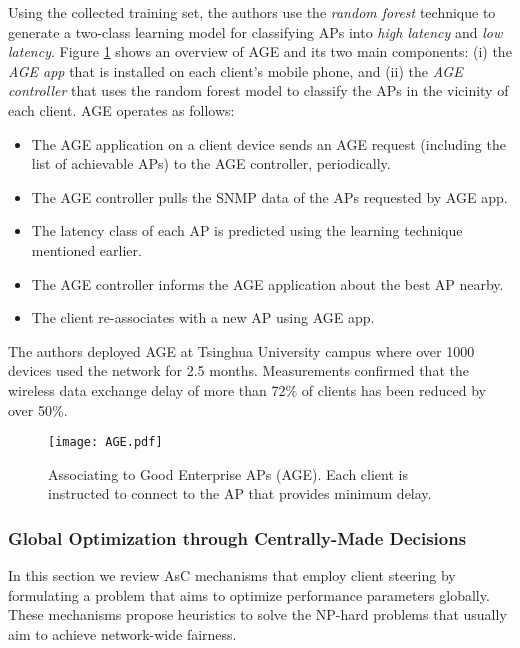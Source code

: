 Using the collected training set, the authors use the \textit{random forest} \cite{random-forest} technique to generate a two-class learning model for classifying APs into \textit{high latency} and \textit{low latency}.
Figure \ref{fig_AGE} shows an overview of AGE and its two main components: (i) the \textit{AGE app} that is installed on each client's mobile phone, and (ii) the \textit{AGE controller} that uses the random forest model to classify the APs in the vicinity of each client.
AGE operates as follows:
\begin{itemize}
	\item The AGE application on a client device sends an AGE request (including the list of achievable APs) to the AGE controller, periodically. 
	\item The AGE controller pulls the SNMP data of the APs requested by AGE app.
	\item The latency class of each AP is predicted using the learning technique mentioned earlier.
	\item The AGE controller informs the AGE application about the best AP nearby.
	\item The client re-associates with a new AP using AGE app. 
\end{itemize}

The authors deployed AGE at Tsinghua University campus where over 1000 devices used the network for 2.5 months. 
Measurements confirmed that the wireless data exchange delay of more than 72$\%$ of clients has been reduced by over 50$\%$.

\begin{figure}[!t]
	\centering
	\texttt{[image: AGE.pdf]}
	\caption{Associating to Good Enterprise APs (AGE)\cite{WiFiSeer}. Each client is instructed to connect to the AP that provides minimum delay.}
	\label{fig_AGE}
\end{figure}




\subsubsection{\textbf{Global Optimization through Centrally-Made Decisions}}
\label{AM-GlobalOpt}
In this section we review AsC mechanisms that employ client steering by formulating a problem that aims to optimize performance parameters globally.
These mechanisms propose heuristics to solve the NP-hard problems that usually aim to achieve network-wide fairness.




